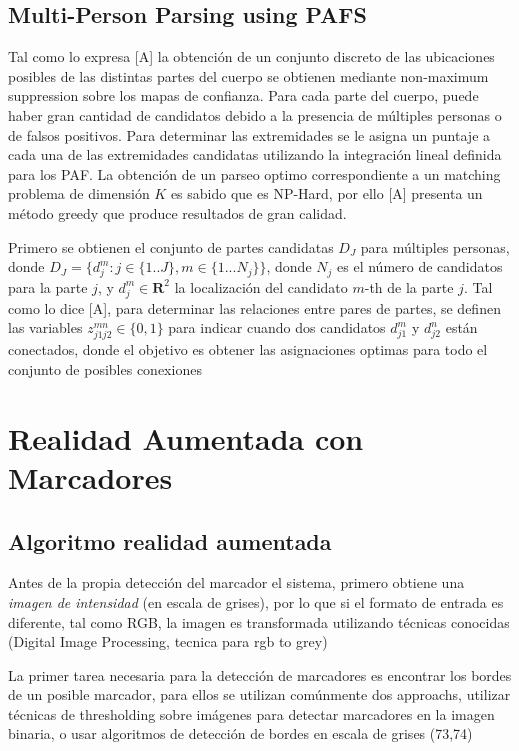 \documentclass[runningheads]{llncs}
\begin{document}
\subsection{Multi-Person Parsing using PAFS}
Tal como lo expresa [A] la obtención de un conjunto discreto de las ubicaciones posibles de las distintas partes del cuerpo se obtienen mediante non-maximum suppression sobre los mapas de confianza. Para cada parte del cuerpo, puede haber gran cantidad de candidatos debido a la presencia de múltiples personas o de falsos positivos. Para determinar las extremidades se le asigna un puntaje a cada una de las extremidades candidatas utilizando la integración lineal definida para los PAF. La obtención de un parseo optimo correspondiente a un matching problema de dimensión $\textit{K}$ es sabido que es NP-Hard, por ello [A] presenta un método greedy que produce resultados de gran calidad.

Primero se obtienen el conjunto de partes candidatas $\textit{D}_\textit{J}$ para múltiples personas, donde $\textit{D}_\textit{J} = \{d_j^m: j\in \{1..J\}, m \in \{1...N_j\} \}$, donde $N_j$ es el número de candidatos para la parte $j$, y $d_j^m \in \mathbf{R}^2$ la localización del candidato $m$-th de la parte $j$.
Tal como lo dice [A], para determinar las relaciones entre pares de partes, se definen las variables $z_{j1j2}^{mn} \in \{0,1\}$ para indicar cuando dos candidatos $d_{j1}^m$ y $d_{j2}^n$ están conectados, donde el objetivo es obtener las asignaciones optimas para todo el conjunto de posibles conexiones  

\section{Realidad Aumentada con Marcadores}

\subsection{Algoritmo realidad aumentada}

Antes de la propia detección del marcador el sistema, primero obtiene una \textit{imagen de intensidad} (en escala de grises), por lo que si el formato de entrada es diferente, tal como RGB, la imagen es transformada utilizando técnicas conocidas
(Digital Image Processing, tecnica para rgb to grey)

La primer tarea necesaria para la detección de marcadores es encontrar los bordes de un posible marcador, para ellos se utilizan comúnmente dos approachs, utilizar técnicas de thresholding sobre imágenes para detectar marcadores en la imagen binaria, o usar algoritmos de detección de bordes en escala de grises (73,74)
\end{document}
